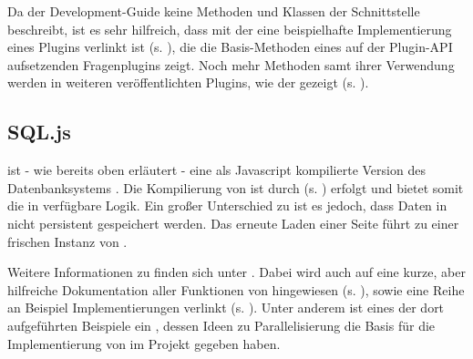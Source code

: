     Da der Development-Guide keine Methoden und Klassen der Schnittstelle beschreibt, ist es sehr hilfreich, dass mit der  eine beispielhafte Implementierung eines Plugins verlinkt ist (s. \cite{AssExampleQuestion}), die die Basis-Methoden eines auf der  Plugin-API aufsetzenden Fragenplugins zeigt. Noch mehr Methoden samt ihrer Verwendung werden in weiteren veröffentlichten Plugins, wie der  gezeigt (s. \cite{AssCodeQuestion}).

\subsection{SQL.js}
\label{subsec:sql-js}

     ist - wie bereits oben erläutert - eine als Javascript kompilierte Version des Datenbanksystems . Die Kompilierung von  ist durch  (s. \cite{Emscripten}) erfolgt und bietet somit die in  verfügbare  Logik. Ein großer Unterschied zu  ist es jedoch, dass Daten in  nicht persistent gespeichert werden. Das erneute Laden einer Seite führt zu einer frischen Instanz von .
    
    Weitere Informationen zu  finden sich unter \cite{SQLjs}. Dabei wird auch auf eine kurze, aber hilfreiche Dokumentation aller Funktionen von  hingewiesen (s. \cite{SQLjsDocu}), sowie eine Reihe an Beispiel Implementierungen verlinkt (s. \cite{SQLjsExa}). Unter anderem ist eines der dort aufgeführten Beispiele ein , dessen Ideen zu Parallelisierung die Basis für die Implementierung von  im  Projekt gegeben haben.